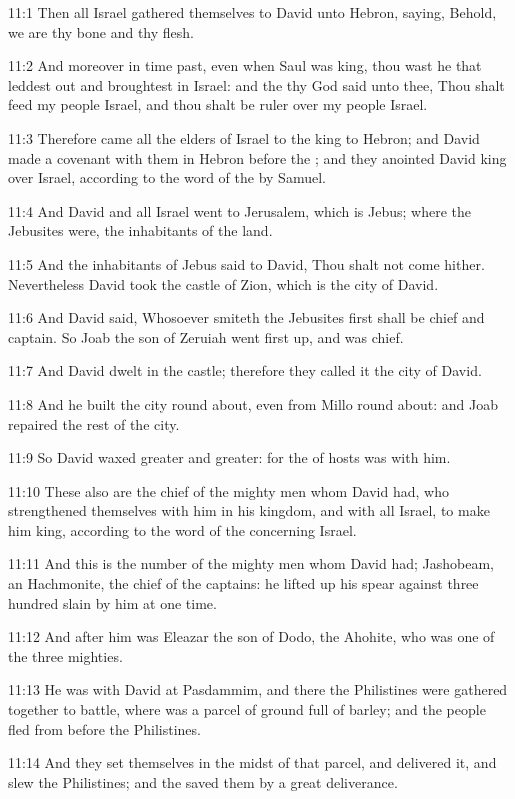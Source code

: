 11:1 Then all Israel gathered themselves to David unto Hebron, saying,
Behold, we are thy bone and thy flesh.

11:2 And moreover in time past, even when Saul was king, thou wast he
that leddest out and broughtest in Israel: and the \LORD thy God said
unto thee, Thou shalt feed my people Israel, and thou shalt be ruler
over my people Israel.

11:3 Therefore came all the elders of Israel to the king to Hebron;
and David made a covenant with them in Hebron before the \LORD; and
they anointed David king over Israel, according to the word of the
\LORD by Samuel.

11:4 And David and all Israel went to Jerusalem, which is Jebus; where
the Jebusites were, the inhabitants of the land.

11:5 And the inhabitants of Jebus said to David, Thou shalt not come
hither. Nevertheless David took the castle of Zion, which is the city
of David.

11:6 And David said, Whosoever smiteth the Jebusites first shall be
chief and captain. So Joab the son of Zeruiah went first up, and was
chief.

11:7 And David dwelt in the castle; therefore they called it the city
of David.

11:8 And he built the city round about, even from Millo round about:
and Joab repaired the rest of the city.

11:9 So David waxed greater and greater: for the \LORD of hosts was
with him.

11:10 These also are the chief of the mighty men whom David had, who
strengthened themselves with him in his kingdom, and with all Israel,
to make him king, according to the word of the \LORD concerning Israel.

11:11 And this is the number of the mighty men whom David had;
Jashobeam, an Hachmonite, the chief of the captains: he lifted up his
spear against three hundred slain by him at one time.

11:12 And after him was Eleazar the son of Dodo, the Ahohite, who was
one of the three mighties.

11:13 He was with David at Pasdammim, and there the Philistines were
gathered together to battle, where was a parcel of ground full of
barley; and the people fled from before the Philistines.

11:14 And they set themselves in the midst of that parcel, and
delivered it, and slew the Philistines; and the \LORD saved them by a
great deliverance.

